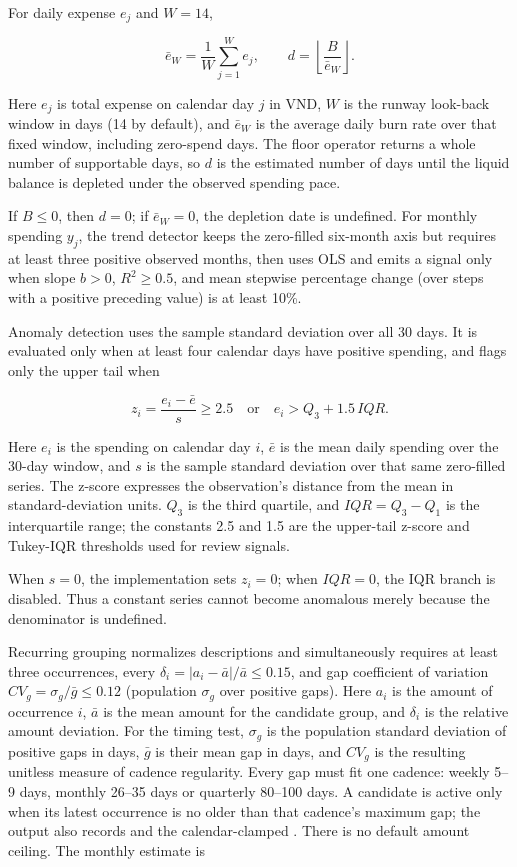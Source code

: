 For daily expense $e_j$ and $W=14$,

\begin{equation}
  \bar e_W=\frac{1}{W}\sum_{j=1}^{W}e_j,\qquad
  d=\left\lfloor\frac{B}{\bar e_W}\right\rfloor.
\end{equation}

Here $e_j$ is total expense on calendar day $j$ in VND, $W$ is the runway look-back window in days (14 by default), and $\bar e_W$ is the average daily burn rate over that fixed window, including zero-spend days. The floor operator returns a whole number of supportable days, so $d$ is the estimated number of days until the liquid balance is depleted under the observed spending pace.

If $B\leq0$, then $d=0$; if $\bar e_W=0$, the depletion date is undefined. For monthly spending $y_j$, the trend detector keeps the zero-filled six-month axis but requires at least three positive observed months, then uses OLS and emits a signal only when slope $b>0$, $R^2\geq0.5$, and mean stepwise percentage change (over steps with a positive preceding value) is at least 10\%.

Anomaly detection uses the sample standard deviation over all 30 days. It is evaluated only when at least four calendar days have positive spending, and flags only the upper tail when

\begin{equation}
  z_i=\frac{e_i-\bar e}{s}\geq2.5
  \quad\text{or}\quad
  e_i>Q_3+1.5\,IQR.
\end{equation}

Here $e_i$ is the spending on calendar day $i$, $\bar e$ is the mean daily spending over the 30-day window, and $s$ is the sample standard deviation over that same zero-filled series. The z-score expresses the observation's distance from the mean in standard-deviation units. $Q_3$ is the third quartile, and $IQR=Q_3-Q_1$ is the interquartile range; the constants 2.5 and 1.5 are the upper-tail z-score and Tukey-IQR thresholds used for review signals.

When $s=0$, the implementation sets $z_i=0$; when $IQR=0$, the IQR branch is disabled. Thus a constant series cannot become anomalous merely because the denominator is undefined.

Recurring grouping normalizes descriptions and simultaneously requires at least three occurrences, every $\delta_i=|a_i-\bar a|/\bar a\leq0.15$, and gap coefficient of variation $CV_g=\sigma_g/\bar g\leq0.12$ (population $\sigma_g$ over positive gaps). Here $a_i$ is the amount of occurrence $i$, $\bar a$ is the mean amount for the candidate group, and $\delta_i$ is the relative amount deviation. For the timing test, $\sigma_g$ is the population standard deviation of positive gaps in days, $\bar g$ is their mean gap in days, and $CV_g$ is the resulting unitless measure of cadence regularity. Every gap must fit one cadence: weekly 5--9 days, monthly 26--35 days or quarterly 80--100 days. A candidate is active only when its latest occurrence is no older than that cadence's maximum gap; the output also records  and the calendar-clamped . There is no default amount ceiling. The monthly estimate is

